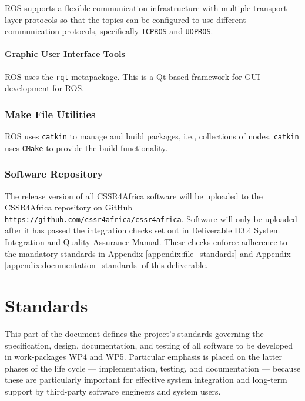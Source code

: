 \documentclass{CSSRforAfrica}
\begin{document}
ROS supports a flexible communication infrastructure with {multiple transport layer protocols} so that the topics can be configured to use different communication protocols, specifically {\small \verb+TCPROS+} and {\small \verb+UDPROS+}.


\subsection{Graphic User Interface Tools}

ROS uses the  {\small \verb+rqt+} metapackage. This is a Qt-based framework for GUI development for ROS.

\section{Make File Utilities}
\label{section:make}

ROS uses  {\small \verb+catkin+} to manage and build packages, i.e., collections of nodes.   {\small \verb+catkin+} uses  {\small \verb+CMake+}  to provide the build functionality.  


\section{Software Repository}
\label{section:repository}

The release version of all CSSR4Africa software will be uploaded to the CSSR4Africa repository on GitHub  {\small \verb+https://github.com/cssr4africa/cssr4africa+}.  Software will only be uploaded after it has passed the integration checks set out in Deliverable D3.4 System Integration and Quality Assurance Manual. These checks enforce adherence to the mandatory standards in Appendix \ref{appendix:file_standards} and Appendix \ref{appendix:documentation_standards} of this deliverable.
 

\newpage
\part{Standards}
\label{part:standards}
 
\setcounter{section}{0}      %

This part of the document defines the project's standards governing the specification, design, documentation, and testing of all software to be developed in work-packages WP4 and WP5.  Particular emphasis is placed on the latter phases of the life cycle --- implementation, testing, and documentation --- because these are particularly important for effective system integration and long-term support by third-party software engineers and system users.  
\end{document}
